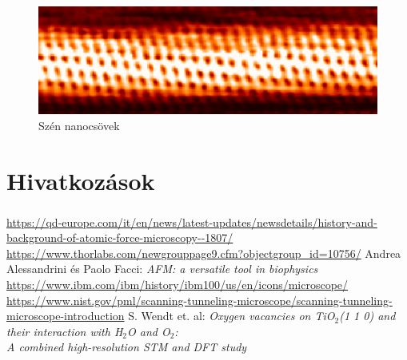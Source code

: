 \documentclass[aspectratio=169]{beamer}
\begin{document}
\begin{frame}
\begin{figure}
\includegraphics[width=.9\textwidth]{stm_end2.png}
\caption{Szén nanocsövek}
\end{figure}
\end{frame}

\section{Hivatkozások}
\begin{frame}
\frametitle{\secname}
\begin{thebibliography}{99}
\small
{}
\url{https://qd-europe.com/it/en/news/latest-updates/newsdetails/history-and-background-of-atomic-force-microscopy--1807/}
\url{https://www.thorlabs.com/newgrouppage9.cfm?objectgroup_id=10756/}
Andrea Alessandrini és Paolo Facci: \textit{AFM: a versatile tool in biophysics}
\url{https://www.ibm.com/ibm/history/ibm100/us/en/icons/microscope/}
\url{https://www.nist.gov/pml/scanning-tunneling-microscope/scanning-tunneling-microscope-introduction}
S. Wendt et. al: \textit{Oxygen vacancies on TiO$_\mathit{2}$(1 1 0) and their interaction with H$_\mathit{2}$O and O$_\mathit{2}$:\\A combined high-resolution STM and DFT study}
\end{thebibliography}
\end{frame}
\end{document}
